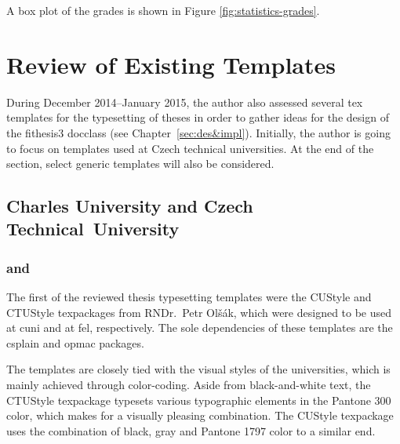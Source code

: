 \documentclass[digital,table,color]{fithesis3/fithesis3}
\begin{document}
  A box plot of the grades is shown in Figure
  \ref{fig:statistics-grades}.

\chapter{Review of Existing Templates}\label{sec:review}
During December 2014--January 2015, the author also assessed
several \gls{tex} templates for the typesetting of theses in order
to gather ideas for the design of the \textsf{fithesis3}
\gls{docclass} (see Chapter~\ref{sec:des&impl}). Initially, the
author is going to focus on templates used at Czech technical
universities. At the end of the section, select generic templates
will also be considered.

  \section{Charles University and Czech Technical~University}
  \subsection{ and }
  \label{sec:ctu&custyle}
  The first of the reviewed thesis typesetting templates were the
  \textsf{CUStyle} \cite{custyle} and \textsf{CTUStyle}
  \cite{ctustyle} \glspl{texpackage} from RNDr.\ Petr Olšák,
  which were designed to be used at \gls{cuni} and at \gls{fel},
  respectively. The sole dependencies of these templates are the
  \gls{csplain} and \gls{opmac} packages.

  The templates are closely tied with the visual styles of the
  universities, which is mainly achieved through color-coding.
  Aside from black-and-white text, the \textsf{CTUStyle}
  \gls{texpackage} typesets various typographic elements in the
   Pantone 300 color, which makes for a
  visually pleasing combination. The \textsf{CUStyle}
  \gls{texpackage} uses the combination of black, gray and
   Pantone 1797 color to a similar end. 
\end{document}
